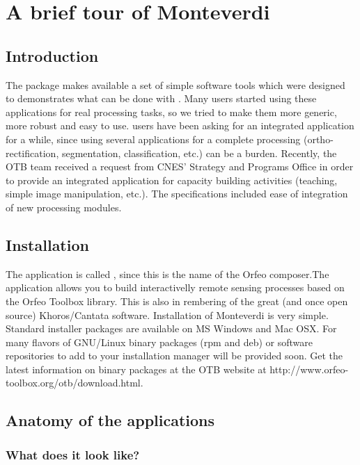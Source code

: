 \chapter{A brief tour of Monteverdi}\label{chap:Monteverdi} 

\section{Introduction}\label{sec:montintro}
The \app package makes available a set of simple software
tools which were designed to demonstrates what can be done with
\otb. Many users started using these applications for real processing
tasks, so we tried to make them more generic, more robust and easy to
use. \otb users have been asking for an integrated application for a
while, since using several applications for a complete processing
(ortho-rectification, segmentation, classification, etc.) can be a
burden. Recently, the OTB team received a request from CNES' Strategy
and Programs Office in order to provide an integrated application for
capacity building activities (teaching, simple image manipulation,
etc.). The specifications included ease of integration of new
processing modules.  

\section{Installation}\label{sec:montinstall} 
The application is called \mont, since this is the name of the Orfeo
composer.The application allows you to build interactivelly remote
sensing processes based on the Orfeo Toolbox library. This is also in
rembering of the great (and once open source) Khoros/Cantata
software.  Installation of Monteverdi is very simple. Standard
installer packages are available on MS Windows and Mac OSX.  For many
flavors of GNU/Linux binary packages (rpm and deb) or software
repositories to add to your installation manager will be provided
soon. Get the latest information on binary packages at the OTB website
at http://www.orfeo-toolbox.org/otb/download.html.

\section{Anatomy of the applications}\label{sec:anatomy}

\subsection{What does it look like?}

